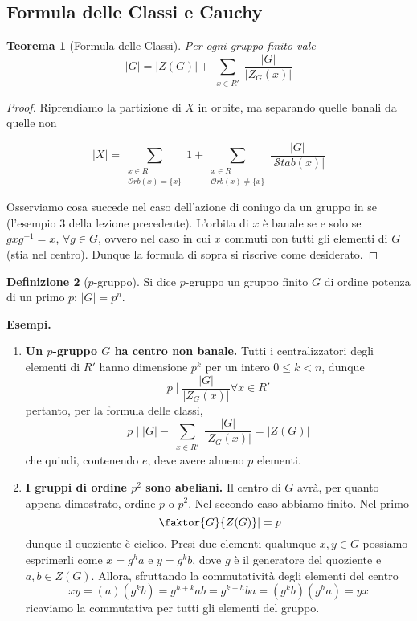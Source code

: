 \documentclass[a4paper]{article}
\newtheorem{theorem}{Teorema}[section]
\theoremstyle{remark}
\theoremstyle{definition}
\newtheorem{definition}[theorem]{Definizione}
\newcommand{\Orb}[1]{\mathcal{O}rb\left( #1 \right)}
\newcommand{\Stab}[1]{\mathcal{S}tab\left( #1 \right)}
\begin{document}
\subsection{Formula delle Classi e Cauchy}
\begin{multicols}{2}

\begin{theorem}[Formula delle Classi]
	Per ogni gruppo finito vale
	\[ |G| = |Z(G)| + \sum_{\substack{x \in R'}} \frac{|G|}{|Z_G(x)|} \]
\end{theorem}
\begin{proof}
	Riprendiamo la partizione di $ X $ in orbite, ma separando quelle banali da quelle non
	
	\[ |X| = \sum_{\substack{x \in R \\ \Orb{x} = \{x\} }} 1 + \sum_{\substack{x \in R \\ \Orb{x} \neq \{x\} }} \frac{|G|}{|\Stab{x}|} \]
	
	Osserviamo cosa succede nel caso dell'azione di coniugo da un gruppo in se (l'esempio 3 della lezione precedente). L'orbita di $ x $ è banale se e solo se $ gxg^{-1} = x $, $ \forall g \in G $, ovvero nel caso in cui $ x $ commuti con tutti gli elementi di $ G $ (stia nel centro). Dunque la formula di sopra si riscrive come desiderato.
\end{proof}

\begin{definition}[$ p $-gruppo]
	Si dice $ p $-gruppo un gruppo finito $ G $ di ordine potenza di un primo $ p $: $ |G| = p^n $.
\end{definition}

\textbf{Esempi.}
\begin{enumerate}
	\item \textbf{Un $ p $-gruppo $ G $ ha centro non banale.} Tutti i centralizzatori degli elementi di $ R' $ hanno dimensione $ p^k $ per un intero $ 0 \leq k < n $, dunque
	\[ p \mid \frac{|G|}{|Z_G(x)|} \forall x \in R' \]
	pertanto, per la formula delle classi,
	\[ p \mid |G| - \sum_{\substack{x \in R'}} \frac{|G|}{|Z_G(x)|} = |Z(G)| \]
	che quindi, contenendo $ e $, deve avere almeno $ p $ elementi.
	
	\item \textbf{I gruppi di ordine $ p^2 $ sono abeliani.} Il centro di $ G $ avrà, per quanto appena dimostrato, ordine $ p $ o $ p^2 $. Nel secondo caso abbiamo finito. Nel primo \[  \left|\faktor{G}{Z(G)}\right| = p \] dunque il quoziente è ciclico. Presi due elementi qualunque $ x, y \in G $ possiamo esprimerli come $ x = g^h a $ e $ y = g^k b $, dove $ g $ è il generatore del quoziente e $ a, b \in Z(G) $. Allora, sfruttando la commutatività degli elementi del centro \[ xy = ( a) (g^k b) = g^{h+k} ab = g^{k+h} ba = (g^k b) (g^h a) = yx \]
	ricaviamo la commutativa per tutti gli elementi del gruppo.
	

\end{enumerate}
\end{multicols}
\end{document}
